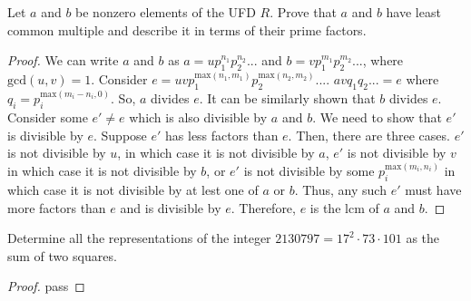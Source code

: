 \documentclass[10pt]{article}
\newenvironment{problem}[2][Problem]{\begin{trivlist}
		\item[\hskip \labelsep {\bfseries #1}\hskip \labelsep {\bfseries #2.}]}{\end{trivlist}}
\begin{document}
		\begin{problem}{3.2}
			Let $a$ and $b$ be nonzero elements of the UFD $R$. Prove that $a$ and $b$ have least common multiple and describe it in terms of their prime factors.
			\begin{proof}
				We can write $a$ and $b$ as $a=up_{1}^{n_1}p_{2}^{n_2}...$ and $b=vp_{1}^{m_1}p_{2}^{m_2}...$, where $\text{gcd}(u,v)=1$. Consider $e=uvp_{1}^{\text{max}(n_1, m_1)}p_{2}^{\text{max}(n_2, m_2)}...$. $avq_{1}q_{2}... = e$ where $q_i = p_i^{\text{max}(m_i-n_i, 0)}$. So, $a$ divides $e$. It can be similarly shown that $b$ divides $e$. Consider some $e' \not = e$  which is also divisible by $a$ and $b$. We need to show that $e'$ is divisible by $e$. Suppose $e'$ has less factors than $e$. Then, there are three cases. $e'$ is not divisible by $u$, in which case it is not divisible by $a$, $e'$ is not divisible by $v$ in which case it is not divisible by $b$, or $e'$ is not divisible by some $p_i^{\text{max}(m_i, n_i)}$ in which case it is not divisible by at lest one of $a$ or $b$. Thus, any such $e'$ must have more factors than $e$ and is divisible by $e$. Therefore, $e$ is the lcm of $a$ and $b$.
			\end{proof}
		\end{problem}
		
		\begin{problem}{3.3}
			Determine all the representations of the integer $2130797 = 17^{2} \cdot 73 \cdot 101$ as the sum of two squares.
			\begin{proof}
				pass
			\end{proof}
		
		\end{problem}
		
		
		
		
		
\end{document}
